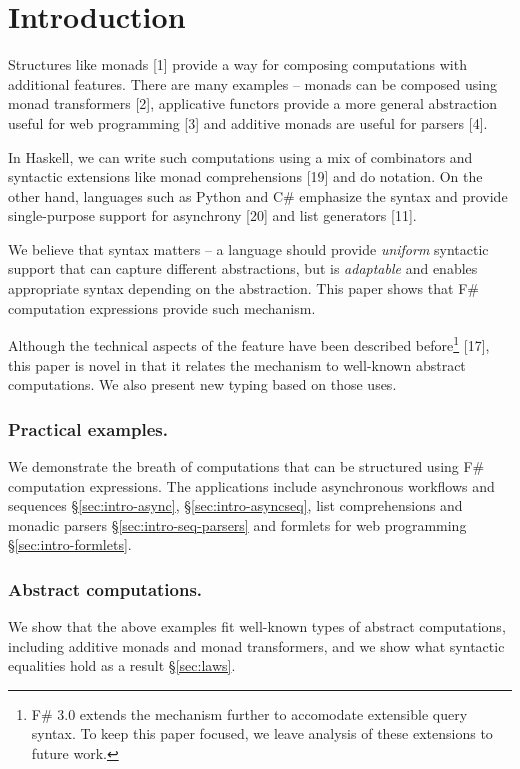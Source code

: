 \documentclass[runningheads,a4paper]{llncs}
\begin{document}

\section{Introduction}
Structures like monads [1] provide a way for composing computations with additional features. 
There are many examples -- monads can be composed using monad transformers [2], applicative
functors provide a more general abstraction useful for web programming [3] and additive monads
are useful for parsers [4].

In Haskell, we can write such computations using a mix of combinators and syntactic extensions like 
monad comprehensions [19] and do notation. On the other hand, languages such as Python and C\# 
emphasize the syntax and provide single-purpose support for asynchrony [20] and list generators [11]. 

We believe that syntax matters -- a language should provide \emph{uniform} syntactic support that 
can capture different abstractions, but is \emph{adaptable} and enables appropriate syntax depending
on the abstraction. This paper shows that F\# computation expressions provide such mechanism.

Although the technical aspects of the feature have been described before\footnote{F\# 3.0 extends the 
mechanism further to accomodate extensible query syntax. To keep this paper focused, we leave analysis 
of these extensions to future work.} [17], this paper is novel in that it relates the mechanism to 
well-known abstract computations. We also present new typing based on those uses.

\subsubsection{Practical examples.} 
We demonstrate the breath of computations that can be structured using F\# computation expressions.
The applications include asynchronous workflows and sequences \S\ref{sec:intro-async}, 
\S\ref{sec:intro-asyncseq}, list comprehensions and monadic parsers \S\ref{sec:intro-seq-parsers}
and formlets for web programming \S\ref{sec:intro-formlets}.

\vspace{-1em}
\subsubsection{Abstract computations.} We show that the above examples fit well-known types
of abstract computations, including additive monads and monad transformers, and we show what 
syntactic equalities hold as a result \S\ref{sec:laws}.
\end{document}
